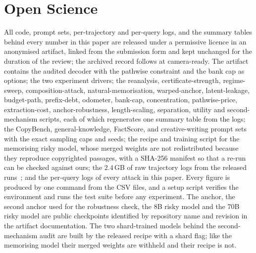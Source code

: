 \section*{Open Science}
All code, prompt sets, per-trajectory and per-query logs, and the summary tables behind every number in this paper are released under a permissive licence in an anonymised artifact, linked from the submission form and kept unchanged for the duration of the review; the archived record follows at camera-ready. The artifact contains the audited decoder with the pathwise constraint and the bank cap as options; the two experiment drivers; the reanalysis, certificate-strength, regime-sweep, composition-attack, natural-memorisation, warped-anchor, latent-leakage, budget-path, prefix-debt, odometer, bank-cap, concentration, pathwise-price, extraction-cost, anchor-robustness, length-scaling, separation, utility and second-mechanism scripts, each of which regenerates one summary table from the logs; the CopyBench, general-knowledge, FactScore, and creative-writing prompt sets with the exact sampling caps and seeds; the recipe and training script for the memorising risky model, whose merged weights are not redistributed because they reproduce copyrighted passages, with a SHA-256 manifest so that a re-run can be checked against ours; the $2.4$\,GB of raw trajectory logs from the released runs~\cite{vijayavallabh2026audit}; and the per-query logs of every attack in this paper. Every figure is produced by one command from the CSV files, and a setup script verifies the environment and runs the test suite before any experiment. The anchor, the second anchor used for the robustness check, the 8B risky model and the 70B risky model are public checkpoints identified by repository name and revision in the artifact documentation. The two shard-trained models behind the second-mechanism audit are built by the released recipe with a shard flag; like the memorising model their merged weights are withheld and their recipe is not.

